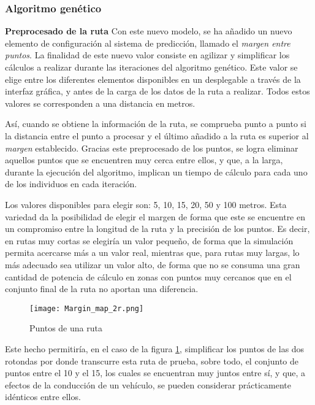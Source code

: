 \documentclass[11pt,spanish,listoffigures,listoftables]{tfgetsinf}
\begin{document}
\subsubsection{Algoritmo genético}
\label{section:adv_gen_alg}
\noindent\textbf{Preprocesado de la ruta}\newline
\label{Adv_AG}
Con este nuevo modelo, se ha añadido un nuevo elemento de configuración al sistema de predicción, llamado el \textit{margen entre puntos}. La finalidad de este nuevo valor consiste en agilizar y simplificar los cálculos a realizar durante las iteraciones del algoritmo genético. Este valor se elige entre los diferentes elementos disponibles en un desplegable a través de la interfaz gráfica, y antes de la carga de los datos de la ruta a realizar. Todos estos valores se corresponden a una distancia en metros.

Así, cuando se obtiene la información de la ruta, se comprueba punto a punto si la distancia entre el punto a procesar y el último añadido a la ruta es superior al \textit{margen} establecido. Gracias este preprocesado de los puntos, se logra eliminar aquellos puntos que se encuentren muy cerca entre ellos, y que, a la larga, durante la ejecución del algoritmo, implican un tiempo de cálculo para cada uno de los individuos en cada iteración.

Los valores disponibles para elegir son: 5, 10, 15, 20, 50 y 100 metros. Esta variedad da la posibilidad de elegir el margen de forma que este se encuentre en un compromiso entre la longitud de la ruta y la precisión de los puntos. Es decir, en rutas muy cortas se elegiría un valor pequeño, de forma que la simulación permita acercarse más a un valor real, mientras que, para rutas muy largas, lo más adecuado sea utilizar un valor alto, de forma que no se consuma una gran cantidad de potencia de cálculo en zonas con puntos muy cercanos que en el conjunto final de la ruta no aportan una diferencia.\newline

\begin{figure}[!htb]
    \centering
    \texttt{[image: Margin\_map\_2r.png]}
    \caption{Puntos de una ruta}
    \label{fig:margin_points}
\end{figure}

Este hecho permitiría, en el caso de la figura \ref{fig:margin_points}, simplificar los puntos de las dos rotondas por donde transcurre esta ruta de prueba, sobre todo, el conjunto de puntos entre el 10 y el 15, los cuales se encuentran muy juntos entre sí, y que, a efectos de la conducción de un vehículo, se pueden considerar prácticamente idénticos entre ellos.
\end{document}
